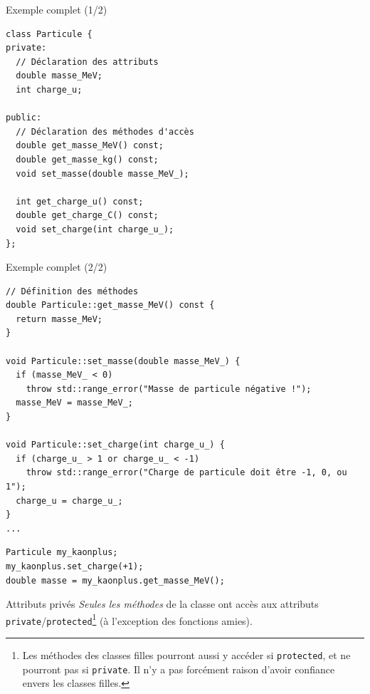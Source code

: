 \documentclass[c]{beamer}
\newcommand{\inline}[1]{\texttt{#1}}
\begin{document}
\begin{frame}[fragile]{Exemple complet (1/2)}
 \begin{verbatim}
class Particule {
private:
  // Déclaration des attributs
  double masse_MeV;
  int charge_u;

public:
  // Déclaration des méthodes d'accès
  double get_masse_MeV() const;
  double get_masse_kg() const;
  void set_masse(double masse_MeV_);

  int get_charge_u() const;
  double get_charge_C() const;
  void set_charge(int charge_u_);
};
\end{verbatim}
\end{frame}


\begin{frame}[fragile]{Exemple complet (2/2)}

\begin{verbatim}
// Définition des méthodes
double Particule::get_masse_MeV() const {
  return masse_MeV;
}

void Particule::set_masse(double masse_MeV_) {
  if (masse_MeV_ < 0)
    throw std::range_error("Masse de particule négative !");
  masse_MeV = masse_MeV_;
}

void Particule::set_charge(int charge_u_) {
  if (charge_u_ > 1 or charge_u_ < -1)
    throw std::range_error("Charge de particule doit être -1, 0, ou 1");
  charge_u = charge_u_;
}
...
\end{verbatim}
\pause
\begin{verbatim}
Particule my_kaonplus;
my_kaonplus.set_charge(+1);
double masse = my_kaonplus.get_masse_MeV();
\end{verbatim}

\end{frame}


\begin{frame}[fragile]{Attributs privés}
\emph{Seules les méthodes} de la classe ont accès aux attributs \inline{private}/\inline{protected}\footnote{Les méthodes des classes filles pourront aussi y accéder si \inline{protected}, et ne pourront pas si \inline{private}. Il n'y a pas forcément raison d'avoir confiance envers les classes filles.} (à l'exception des fonctions amies).
\end{frame}
\end{document}
